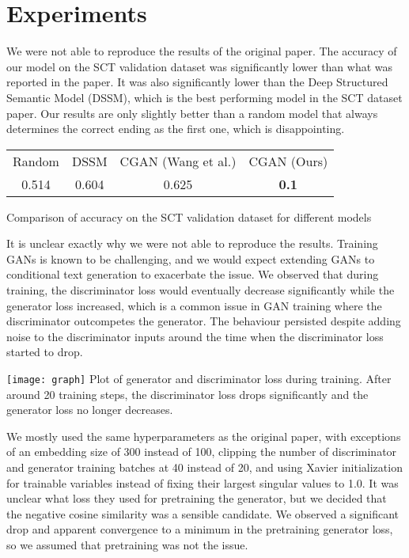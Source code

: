 \documentclass{article}
\begin{document}
\section{Experiments}
We were not able to reproduce the results of the original paper. The accuracy of our model on the SCT validation dataset was significantly lower than what was reported in the paper. It was also significantly lower than the Deep Structured Semantic Model (DSSM), which is the best performing model in the SCT dataset paper. Our results are only slightly better than a random model that always determines the correct ending as the first one, which is disappointing.
\begin{center}
\begin{tabular}{ | c c c c |}
\hline
Random & DSSM & CGAN (Wang et al.) & CGAN (Ours) \\ 
 0.514 & 0.604 & 0.625 & \textbf{0.1} \\  
 \hline
\end{tabular} 
\par
Comparison of accuracy on the SCT validation dataset for different models
\end{center}
It is unclear exactly why we were not able to reproduce the results. Training GANs is known to be challenging, and we would expect extending GANs to conditional text generation to exacerbate the issue. We observed that during training, the discriminator loss would eventually decrease significantly while the generator loss increased, which is a common issue in GAN training where the discriminator outcompetes the generator. The behaviour persisted despite adding noise to the discriminator inputs around the time when the discriminator loss started to drop.
\begin{center}
 \vspace{-4pt}
\texttt{[image: graph]}
Plot of generator and discriminator loss during training. After around 20 training steps, the discriminator loss drops significantly and the generator loss no longer decreases.
\end{center}
We mostly used the same hyperparameters as the original paper, with exceptions of an embedding size of 300 instead of 100, clipping the number of discriminator and generator training batches at 40 instead of 20, and using Xavier initialization for trainable variables instead of fixing their largest singular values to 1.0. It was unclear what loss they used for pretraining the generator, but we decided that the negative cosine similarity was a sensible candidate.  We observed a significant drop and apparent convergence to a minimum in the pretraining generator loss, so we assumed that pretraining was not the issue.
\end{document}
